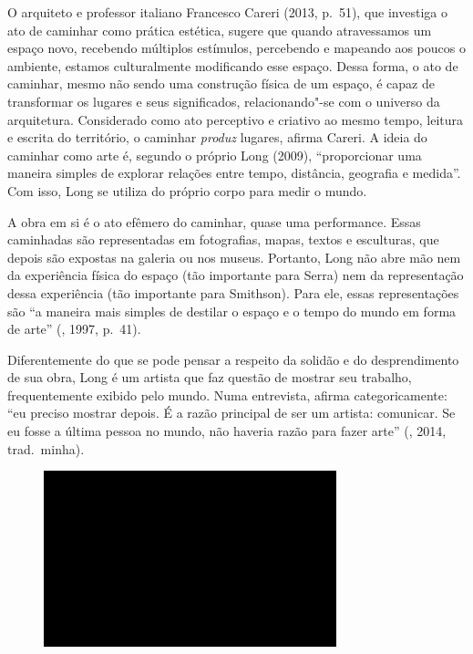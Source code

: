O arquiteto e professor italiano Francesco Careri (2013, p.~51), que
investiga o ato de caminhar como prática estética, sugere que quando
atravessamos um espaço novo, recebendo múltiplos estímulos, percebendo e
mapeando aos poucos o ambiente, estamos culturalmente modificando esse
espaço. Dessa forma, o ato de caminhar, mesmo não sendo uma construção
física de um espaço, é capaz de transformar os lugares e seus
significados, relacionando"-se com o universo da arquitetura. Considerado
como ato perceptivo e criativo ao mesmo tempo, leitura e escrita do
território, o caminhar \emph{produz} lugares, afirma Careri. A ideia do
caminhar como arte é, segundo o próprio Long (2009), ``proporcionar uma
maneira simples de explorar relações entre tempo, distância, geografia e
medida''. Com isso, Long se utiliza do próprio corpo para medir o mundo.

A obra em si é o ato efêmero do caminhar, quase uma performance. Essas
caminhadas são representadas em fotografias, mapas, textos e esculturas,
que depois são expostas na galeria ou nos museus. Portanto, Long não
abre mão nem da experiência física do espaço (tão importante para Serra)
nem da representação dessa experiência (tão importante para Smithson).
Para ele, essas representações são ``a
maneira mais simples de destilar o espaço e o tempo do mundo em forma
de arte'' (, 1997, p.~41).

Diferentemente do que se pode pensar a respeito da solidão e do
desprendimento de sua obra, Long é um artista que faz questão de mostrar
seu trabalho, frequentemente exibido pelo mundo. Numa entrevista, afirma categoricamente: ``eu preciso mostrar depois. É a razão principal de ser um artista: comunicar. Se eu
fosse a última pessoa no mundo, não haveria razão para fazer arte'' (, 2014, trad.~minha).

\begin{figure}[!ht]

\centering
 \includegraphics[width=85mm]{./imgs/im1.jpg}
\caption{\tiny{}}

\end{figure}

